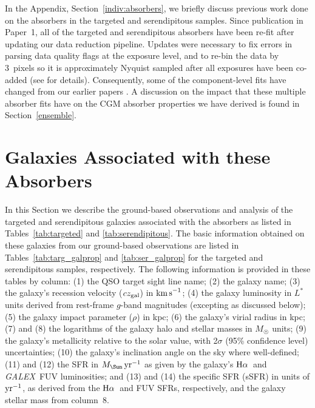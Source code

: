 \documentclass[twocolumn,twocolappendix,tighten,times]{aastex6}
\newcommand{\galex}{{\sl GALEX}}
\newcommand{\Ha}{\ensuremath{{\rm H}\alpha}}
\newcommand{\kms}{\ensuremath{{\rm km\,s}^{-1}}}
\begin{document}
In the Appendix, Section~\ref{indiv:absorbers}, we briefly discuss previous
work done on the absorbers in the targeted and serendipitous samples.
Since publication in Paper~1, all of the targeted and serendipitous absorbers 
have been re-fit after updating our data reduction pipeline. Updates were 
necessary to fix errors in parsing data quality flags at the exposure level, and 
to re-bin the data by 3~pixels so it is approximately Nyquist sampled after all 
exposures have been co-added (see \citealp{danforth16} for details). 
Consequently, some of the component-level fits have changed from our earlier 
papers \citep[Paper~1 and][]{danforth16}. A discussion on the impact that these 
multiple absorber fits have on the CGM absorber properties we have derived is 
found in Section~\ref{ensemble}.




\vspace{0.5in}
\section{Galaxies Associated with these Absorbers}
\label{galaxies}

In this Section we describe the ground-based observations and analysis
of the targeted and serendipitous galaxies associated with the
absorbers as listed in Tables~\ref{tab:targeted} and
\ref{tab:serendipitous}. The basic information obtained on these
galaxies from our ground-based observations are listed in
Tables~\ref{tab:targ_galprop} and \ref{tab:ser_galprop}  for the
targeted and serendipitous samples, respectively. The following
information is provided in these tables by column: (1) the QSO target
sight line name; (2) the galaxy name; (3) the galaxy's recession
velocity ($cz_{\rm gal}$) in \kms;  (4) the galaxy luminosity in $L^*$
units derived from rest-frame $g$-band magnitudes (excepting as
discussed below); (5) the galaxy impact parameter ($\rho$) in kpc; (6)
the galaxy's virial radius in kpc; (7) and (8) the logarithms of the
galaxy halo and stellar masses in $M_{\Sun}$ units; (9) the galaxy's
metallicity relative to the  solar value, with 2$\sigma$
(95\% confidence level) uncertainties; (10) the galaxy's inclination
angle on the sky where well-defined; (11) and (12) the SFR in
$M_{\Sun}\,{\rm yr}^{-1}$ as given by the galaxy's \Ha\ and \galex\
FUV  luminosities; and (13) and (14) the specific SFR (sSFR) in units
of ${\rm yr}^{-1}$, as derived from the \Ha\ and FUV SFRs,
respectively, and the galaxy stellar mass from column~8.
\end{document}
